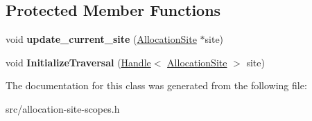 \subsection*{Protected Member Functions}
\begin{DoxyCompactItemize}
\item 
\hypertarget{classv8_1_1internal_1_1_allocation_site_context_a2e094902dbadc8931c82eb04333807c0}{}void {\bfseries update\+\_\+current\+\_\+site} (\hyperlink{classv8_1_1internal_1_1_allocation_site}{Allocation\+Site} $\ast$site)\label{classv8_1_1internal_1_1_allocation_site_context_a2e094902dbadc8931c82eb04333807c0}

\item 
\hypertarget{classv8_1_1internal_1_1_allocation_site_context_a2ae0994fc850605cbea75aeddf980b44}{}void {\bfseries Initialize\+Traversal} (\hyperlink{classv8_1_1internal_1_1_handle}{Handle}$<$ \hyperlink{classv8_1_1internal_1_1_allocation_site}{Allocation\+Site} $>$ site)\label{classv8_1_1internal_1_1_allocation_site_context_a2ae0994fc850605cbea75aeddf980b44}

\end{DoxyCompactItemize}


The documentation for this class was generated from the following file\+:\begin{DoxyCompactItemize}
\item 
src/allocation-\/site-\/scopes.\+h\end{DoxyCompactItemize}
